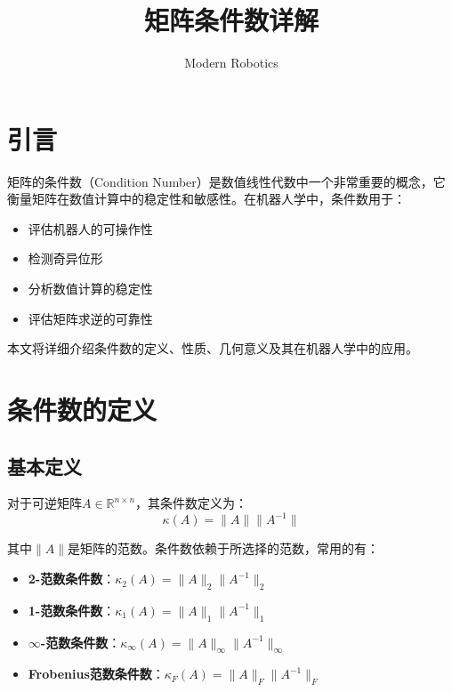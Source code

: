 \documentclass[12pt,a4paper]{article}
\title{矩阵条件数详解}
\author{Modern Robotics}
\date{}
\begin{document}
\maketitle

\tableofcontents
\newpage

\section{引言}

矩阵的条件数（Condition Number）是数值线性代数中一个非常重要的概念，它衡量矩阵在数值计算中的稳定性和敏感性。在机器人学中，条件数用于：

\begin{itemize}
\item 评估机器人的可操作性
\item 检测奇异位形
\item 分析数值计算的稳定性
\item 评估矩阵求逆的可靠性
\end{itemize}

本文将详细介绍条件数的定义、性质、几何意义及其在机器人学中的应用。

\section{条件数的定义}

\subsection{基本定义}

对于可逆矩阵$A \in \mathbb{R}^{n \times n}$，其条件数定义为：
\begin{equation}
\kappa(A) = \|A\| \|A^{-1}\|
\label{eq:condition_number_def}
\end{equation}

其中$\|A\|$是矩阵的范数。条件数依赖于所选择的范数，常用的有：

\begin{itemize}
\item \textbf{2-范数条件数}：$\kappa_2(A) = \|A\|_2 \|A^{-1}\|_2$
\item \textbf{1-范数条件数}：$\kappa_1(A) = \|A\|_1 \|A^{-1}\|_1$
\item \textbf{$\infty$-范数条件数}：$\kappa_\infty(A) = \|A\|_\infty \|A^{-1}\|_\infty$
\item \textbf{Frobenius范数条件数}：$\kappa_F(A) = \|A\|_F \|A^{-1}\|_F$
\end{itemize}
\end{document}

